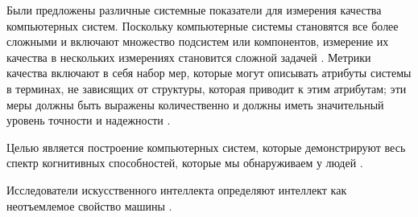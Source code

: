 Были предложены различные системные показатели для измерения качества компьютерных систем. Поскольку компьютерные системы становятся все более сложными и включают множество подсистем или компонентов, измерение их качества в нескольких измерениях становится сложной задачей . Метрики качества включают в себя набор мер, которые могут описывать атрибуты системы в терминах, не зависящих от структуры, которая приводит к этим атрибутам; эти меры должны быть выражены количественно и должны иметь значительный уровень точности и надежности .

Целью является построение компьютерных систем, которые демонстрируют весь спектр когнитивных способностей, которые мы обнаруживаем у людей .

Исследователи искусственного интеллекта определяют интеллект как неотъемлемое свойство машины .